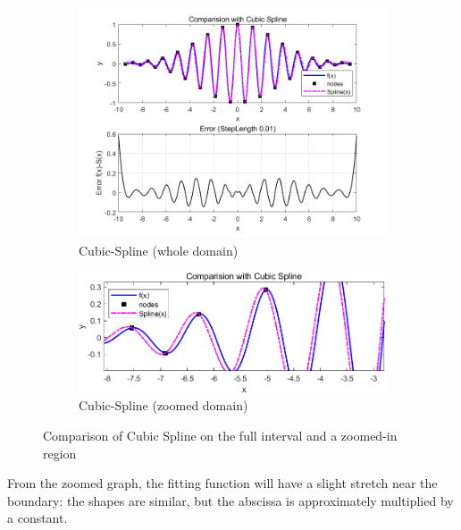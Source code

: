 \documentclass[11pt]{article}
\begin{document}
\begin{figure}[H]
  \centering
  \begin{subfigure}[t]{0.48\textwidth}
    \centering
    \includegraphics[width=\textwidth]{CubicSpline.png}
    \caption{Cubic-Spline (whole domain)}
    \label{fig:nev_whole0}
  \end{subfigure}
  \hfill
  \begin{subfigure}[t]{0.48\textwidth}
    \centering
    \includegraphics[width=\textwidth]{Spline2.png}
    \caption{Cubic-Spline (zoomed domain)}
    \label{fig:nev_small0}
  \end{subfigure}
  \caption{Comparison of Cubic Spline on the full interval and a zoomed-in region}
  \label{fig:nev_compare0}
\end{figure}

\FloatBarrier
From the zoomed graph, the fitting function will have a slight stretch near the boundary: 
the shapes are similar, but the abscissa is approximately multiplied by a constant.\\
\end{document}
